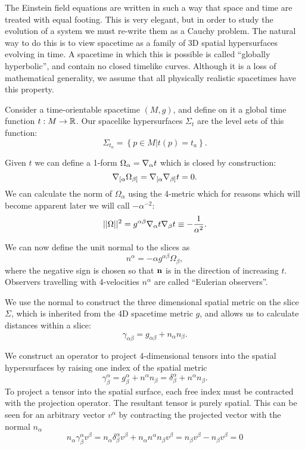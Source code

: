 The Einstein field equations are written in such a way that space and time are treated with equal footing. This is very elegant, but in order to study the evolution of a system we must re-write them as a Cauchy problem. The natural way to do this is to view spacetime as a family of 3D spatial hypersurfaces evolving in time. A spacetime in which this is possible is called ``globally hyperbolic'', and contain no closed timelike curves. Although it is a loss of mathematical generality, we assume that all physically realistic spacetimes have this property.

Consider a time-orientable spacetime $(M, g)$, and define on it a global time function $t:M \rightarrow {\mathbb R}$. Our spacelike hypersurfaces $\Sigma_t$ are the level sets of this function:
\begin{equation}
\Sigma_{t_a} = \left\lbrace p \in M | t(p)=t_a \right\rbrace.
\end{equation}

Given $t$ we can define a 1-form $\Omega_\alpha ={\nabla}_\alpha t$ which is closed by construction:
\begin{equation}
{\nabla}_{[\alpha}\Omega_{\beta]} = {\nabla}_{[\alpha}{\nabla}_{\beta]}t=0.
\end{equation}
We can calculate the norm of $\Omega_\alpha$ using the 4-metric which for reasons which will become apparent later we will call $-\alpha^{-2}$:
\[ ||\Omega ||^2=g^{\alpha \beta}{\nabla}_\alpha t {\nabla}_\beta t \equiv -\frac{1}{\alpha^2}. \]

We can now define the unit normal to the slices as 
\begin{equation}
n^\alpha = -\alpha g^{\alpha \beta} \Omega_\beta,
\end{equation}
where the negative sign is chosen so that $\mathbf{n}$ is in the direction of increasing $t$. Observers travelling with 4-velocities $n^{\alpha}$ are called ``Eulerian observers''.

We use the normal to construct the three dimensional spatial metric on the slice $\Sigma$, which is inherited from the 4D spacetime metric $g$, and allows us to calculate distances within a slice:
\begin{equation}
\gamma_{\alpha \beta} = g_{\alpha \beta} + n_{\alpha} n_{\beta}.
\end{equation}

We construct an operator to project 4-dimensional tensors into the spatial hypersurfaces by raising one index of the spatial metric
\begin{equation}
\gamma^\alpha_\beta = g^\alpha_\beta + n^\alpha n_\beta = \delta^\alpha_\beta + n^\alpha n_\beta. 
\end{equation} 
To project a tensor into the spatial surface, each free index must be contracted with the projection operator. The resultant tensor is purely spatial. This can be seen for an arbitrary vector $v^\alpha$ by contracting the projected vector with the normal $n_\alpha$
\[ n_\alpha \gamma^\alpha _\beta v^\beta = n_\alpha \delta^\alpha_\beta v^\beta + n_\alpha n^\alpha n_\beta v^\beta = n_\beta v^\beta - n_\beta v^\beta = 0 \]


